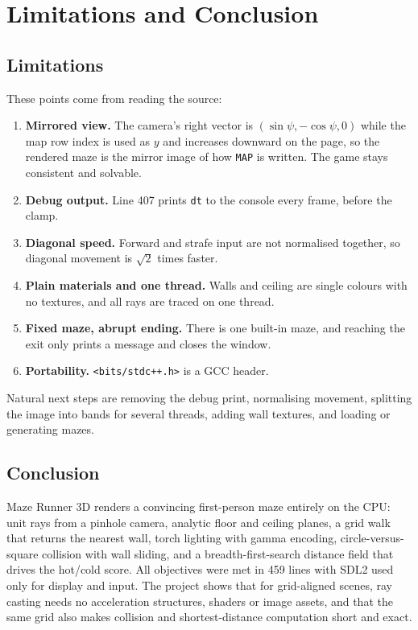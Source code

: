 \chapter{Limitations and Conclusion}

\section{Limitations}

These points come from reading the source:
\begin{enumerate}
    \item \textbf{Mirrored view.} The camera's right vector is $(\sin\psi,-\cos\psi,0)$ while the map row index is used as $y$ and increases downward on the page, so the rendered maze is the mirror image of how \texttt{MAP} is written. The game stays consistent and solvable.
    \item \textbf{Debug output.} Line 407 prints \texttt{dt} to the console every frame, before the clamp.
    \item \textbf{Diagonal speed.} Forward and strafe input are not normalised together, so diagonal movement is $\sqrt2$ times faster.
    \item \textbf{Plain materials and one thread.} Walls and ceiling are single colours with no textures, and all rays are traced on one thread.
    \item \textbf{Fixed maze, abrupt ending.} There is one built-in maze, and reaching the exit only prints a message and closes the window.
    \item \textbf{Portability.} \texttt{<bits/stdc++.h>} is a GCC header.
\end{enumerate}
Natural next steps are removing the debug print, normalising movement, splitting the image into bands for several threads, adding wall textures, and loading or generating mazes.

\section{Conclusion}

Maze Runner 3D renders a convincing first-person maze entirely on the CPU: unit rays from a pinhole camera, analytic floor and ceiling planes, a grid walk that returns the nearest wall, torch lighting with gamma encoding, circle-versus-square collision with wall sliding, and a breadth-first-search distance field that drives the hot/cold score. All objectives were met in 459 lines with SDL2 used only for display and input. The project shows that for grid-aligned scenes, ray casting needs no acceleration structures, shaders or image assets, and that the same grid also makes collision and shortest-distance computation short and exact.
